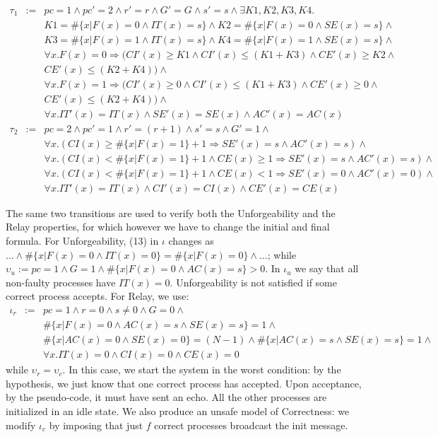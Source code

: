 \documentclass[11pt,a4paper]{article}
\begin{document}
{{\footnotesize
\begin{eqnarray*}
\tau_1 & := & pc=1 \wedge pc'=2 \wedge r'=r \wedge G' =G \wedge s'=s \wedge \exists K1, K2, K3, K4. \\
& & K1 = \#\{x | F(x) =0 \wedge IT(x)=s\} \wedge K2 = \#\{x | F(x) = 0 \wedge SE(x)=s\} \wedge \\
& & K3 = \#\{x | F(x) = 1 \wedge IT(x)=s\} \wedge K4 = \#\{x | F(x) = 1 \wedge SE(x)=s\} \wedge \\
& & \forall x. F(x) =0 \Rightarrow (CI'(x) \geq K1 \wedge CI'(x) \leq (K1+K3) \wedge CE'(x) \geq K2 \wedge \\ 
& & CE'(x) \leq (K2+K4)) \wedge \\
& & \forall x. F(x) =1 \Rightarrow (CI'(x) \geq 0 \wedge CI'(x) \leq (K1+K3) \wedge CE'(x) \geq 0 \wedge \\ 
& & CE'(x) \leq (K2+K4)) \wedge \\
& & \forall x. IT'(x) = IT(x) \wedge SE'(x) = SE(x) \wedge AC'(x) = AC(x) \\
\tau_2 & := & pc=2 \wedge pc' = 1 \wedge r' = (r+1) \wedge s'=s \wedge G'=1 \wedge \\
& & \forall x. (CI(x) \geq \#\{x | F(x)=1\}+1 \Rightarrow SE'(x)=s \wedge AC'(x)=s ) \wedge \\
& & \forall x. (CI(x) < \#\{x | F(x)=1\}+1 \wedge CE(x) \geq 1 \Rightarrow SE'(x)=s \wedge AC'(x)=s) \wedge \\
& & \forall x.  (CI(x) < \#\{x | F(x)=1\}+1 \wedge CE(x) < 1 \Rightarrow SE'(x)=0 \wedge AC'(x)=0) \wedge \\
& & \forall x. IT'(x) = IT(x) \wedge CI'(x) = CI(x) \wedge CE'(x) = CE(x)
\end{eqnarray*}
}

The same two transitions are used to verify both the Unforgeability and the Relay properties, for which however we have to change the initial and final formula.  For Unforgeability, (13) in $\iota$ changes as $... \wedge \#\{x | F(x) = 0 \wedge IT(x)=0\} = \#\{x | F(x) = 0\} \wedge ...$; while $\upsilon_u := pc=1 \wedge G=1 \wedge \#\{x | F(x) =0 \wedge AC(x)=s\} >0$.
In $\iota_u$ we say that all non-faulty processes have $IT(x)=0$.  Unforgeability is not satisfied if some correct process accepts.  For Relay, we use:
{\footnotesize
\begin{eqnarray*}
\iota_r & := & pc=1 \wedge r=0 \wedge s \not =0 \wedge G=0 \wedge \\
& & \#\{x | F(x) = 0 \wedge AC(x) = s \wedge SE(x)=s\} = 1 \wedge \\
& & \#\{x | AC(x)=0 \wedge SE(x)=0\} = (N-1) \wedge \#\{x | AC(x)=s \wedge SE(x)=s\} = 1 \wedge \\
& & \forall x. IT(x) = 0 \wedge CI(x) = 0 \wedge CE(x) = 0
\end{eqnarray*}
}
while $\upsilon_r = \upsilon_c$.  In this case, we start the system in the worst condition: by the hypothesis, we just know that one correct process has accepted.  Upon acceptance, by the pseudo-code, it must have sent an echo.  All the other processes are initialized in an idle state.  We also produce an unsafe model of Correctness: we modify $\iota_c$ by imposing that just $f$ correct processes broadcast the init message.

}
\end{document}
